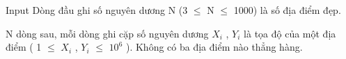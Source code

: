 Input
Dòng đầu ghi số nguyên dương N (3  $\le$  N  $\le$  1000) là số địa điểm đẹp.  

   N dòng sau, mỗi dòng ghi cặp số nguyên dương $X_{i}$   , $Y_{i}$   là tọa độ của một địa điểm ( 1  $\le$  $X_{i}$   , $Y_{i}$    $\le$  $10^{6}$   ). Không có ba địa điểm nào thẳng hàng.